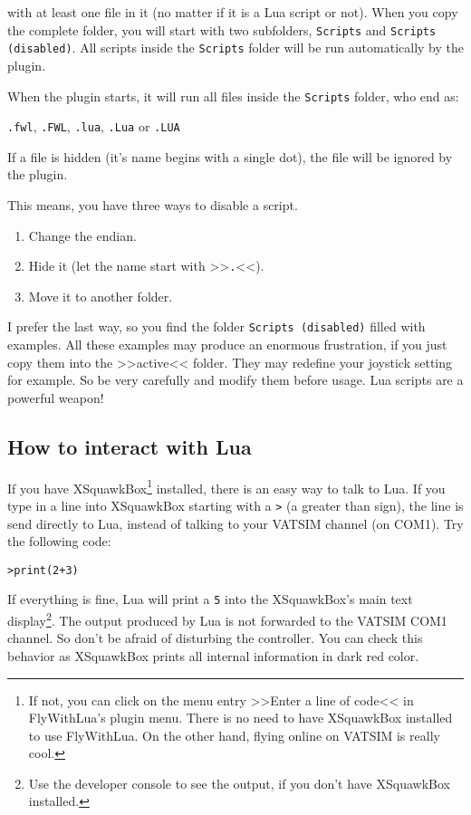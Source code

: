 \documentclass[11pt,parskip=half,a4paper]{scrartcl}
\begin{document}
with at least one file in it (no matter if it is a Lua script or not). When you copy the complete folder, you will start with two subfolders, \verb|Scripts| and \verb|Scripts (disabled)|. All scripts inside the \verb|Scripts| folder will be run automatically by the plugin.

When the plugin starts, it will run all files inside the \verb|Scripts| folder, who end as:

\verb|.fwl|, \verb|.FWL|, \verb|.lua|, \verb|.Lua| or \verb|.LUA|

If a file is hidden (it's name begins with a single dot), the file will be ignored by the plugin.

This means, you have three ways to disable a script.

\begin{enumerate}
\item Change the endian.
\item Hide it (let the name start with >>\verb|.|<<).
\item Move it to another folder.
\end{enumerate}

I prefer the last way, so you find the folder \verb|Scripts (disabled)| filled with examples. All these examples may produce an enormous frustration, if you just copy them into the >>active<< folder. They may redefine your joystick setting for example. So be very carefully and modify them before usage. Lua scripts are a powerful weapon!

\subsection{How to interact with Lua}

If you have XSquawkBox\footnote{If not, you can click on the menu entry >>Enter a line of code<< in FlyWithLua's plugin menu. There is no need to have XSquawkBox installed to use FlyWithLua. On the other hand, flying online on VATSIM is really cool.} installed, there is an easy way to talk to Lua. If you type in a line into XSquawkBox starting with a \verb|>| (a greater than sign), the line is send directly to Lua, instead of talking to your VATSIM channel (on COM1). Try the following code:

\verb|>print(2+3)|

If everything is fine, Lua will print a \verb|5| into the XSquawkBox's main text display\footnote{Use the developer console to see the output, if you don't have XSquawkBox installed.}. The output produced by Lua is not forwarded to the VATSIM COM1 channel. So don't be afraid of disturbing the controller. You can check this behavior as XSquawkBox prints all internal information in dark red color.
\end{document}
